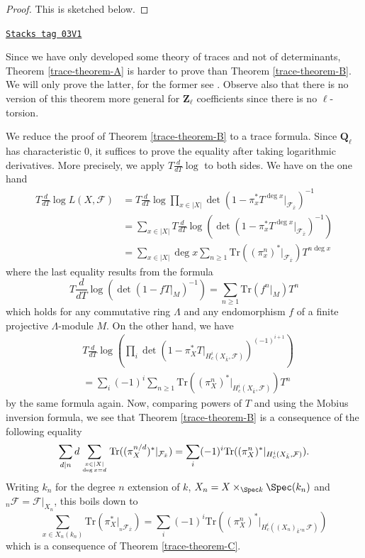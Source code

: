 \begin{proof}
This is sketched below.
\end{proof}

\begin{remark}
\label{trace-remark-which-is-harder}
\href{https://stacks.math.columbia.edu/tag/03V1}{\texttt{Stacks tag 03V1}}

Since we have only developed some theory of traces and not of determinants,
Theorem \ref{trace-theorem-A}
is harder to prove than
Theorem \ref{trace-theorem-B}.
We will only prove the latter, for the former see \cite{SGA4.5}.
Observe also that there is no version of this theorem more general for
$\mathbf{Z}_\ell$ coefficients since there is no $\ell$-torsion.
\end{remark}

We reduce the proof of Theorem \ref{trace-theorem-B} to a trace formula. Since
$\mathbf{Q}_\ell$ has characteristic 0, it suffices to prove the equality after
taking logarithmic derivatives. More precisely, we apply $T\frac{d}{dT} \log$
to both sides. We have on the one hand
\begin{align*}
T \frac{d}{dT} \log L(X, \mathcal{F})
& =
T\frac{d}{dT} \log
\prod_{x \in |X|} \det(1 - \pi_x^* T^{\deg x} |_{\mathcal{F}_{\bar x}})^{-1} \\
& =
\sum_{x \in |X|} T \frac{d}{dT} \log
( \det(1 - \pi_x^* T^{\deg x} |_{\mathcal{F}_{\bar x}})^{-1}) \\
& =
\sum_{x \in |X|} \deg x
\sum_{n \geq 1} \text{Tr}((\pi_x^n)^* |_{\mathcal{F}_{\bar x}}) T^{n\deg x}
\end{align*}
where the last equality results from the formula
$$
T\frac{d}{dT}\log\left(\det\left(1-fT|_M\right)^{-1}\right) = \sum_{n\geq 1}
\text{Tr}(f^n|_M)T^n
$$
which holds for any commutative ring $\Lambda$ and any endomorphism $f$ of a
finite projective $\Lambda$-module $M$. On the other hand, we have
\begin{align*}
& T\frac{d}{dT} \log\left(
\prod\nolimits_i
\det(1-\pi_X^*T |_{H_c^i\left(X_{\bar k} , \mathcal{F}\right)})^{(-1)^{i+1}}
\right) \\
& =
\sum\nolimits_i (-1)^i \sum\nolimits_{n \geq 1}
\text{Tr}\left((\pi_X^n)^* |_{H_c^i(X_{\bar k},\mathcal{F})}\right) T^n
\end{align*}
by the same formula again. Now, comparing powers of $T$ and using the Mobius
inversion formula, we see that Theorem \ref{trace-theorem-B} is a consequence of the
following equality
$$
\sum_{d | n} d \sum_{x \in |X| \atop \deg x = d}
\text{Tr}((\pi_X^{n/d})^* |_{\mathcal{F}_{\bar x}}) =
\sum_i (-1)^i \text{Tr}((\pi^n_X)^* |_{H^i_c(X_{\bar k}, \mathcal{F})}).
$$
Writing $k_n$ for the degree $n$ extension of $k$,
$X_n = X \times_{\Spec k} \Spec(k_n)$ and
$_n\mathcal{F} = \mathcal{F}|_{X_n}$, this boils down
to
$$
\sum_{x \in X_n(k_n)} \text{Tr}(\pi_X^* |_{_n\mathcal{F}_{\bar x}})
=
\sum_i (-1)^i \text{Tr}((\pi^n_X)^* |_{H^i_c({(X_n)}_{\bar k}, _n\mathcal{F})})
$$
which is a consequence of Theorem \ref{trace-theorem-C}.

